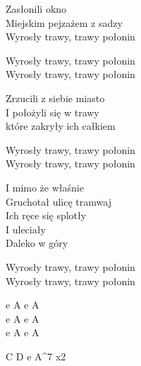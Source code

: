 \begin{text}
    Zasłonili okno\\
    Miejskim pejzażem z sadzy\\
    Wyrosły trawy, trawy połonin

    \vin Wyrosły trawy, trawy połonin\\
    \vin Wyrosły trawy, trawy połonin

    Zrzucili z siebie miasto\\
    I położyli się w trawy\\
    które zakryły ich całkiem

    Wyrosły trawy, trawy połonin\\
    Wyrosły trawy, trawy połonin

    I mimo że właśnie\\
    Gruchotał ulicę tramwaj\\
    Ich ręce się splotły\\
    I uleciały\\
    Daleko w góry

    Wyrosły trawy, trawy połonin\\
    Wyrosły trawy, trawy połonin
\end{text}
\begin{chord}
    e A e A\\
    e A e A\\
    e A e A

    C D e A^7 x2
\end{chord}